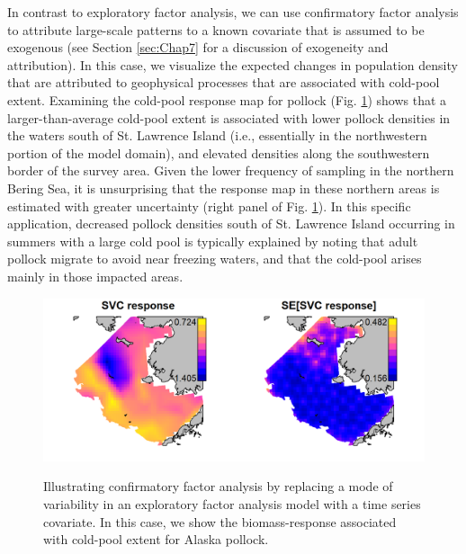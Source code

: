 In contrast to exploratory factor analysis, we can use confirmatory factor analysis to attribute large-scale patterns to a known covariate that is assumed to be exogenous (see Section \ref{sec:Chap7} for a discussion of exogeneity and attribution).  In this case, we visualize the expected changes in population density that are attributed to geophysical processes that are associated with cold-pool extent.  Examining the cold-pool response map for pollock (Fig. \ref{fig:Chap9_SVC_response}) shows that a larger-than-average cold-pool extent is associated with lower pollock densities in the waters south of St. Lawrence Island (i.e., essentially in the northwestern portion of the model domain), and elevated densities along the southwestern border of the survey area.  Given the lower frequency of sampling in the northern Bering Sea, it is unsurprising that the response map in these northern areas is estimated with greater uncertainty (right panel of Fig. \ref{fig:Chap9_SVC_response}).  In this specific application, decreased pollock densities south of St. Lawrence Island occurring in summers with a large cold pool is typically explained by noting that adult pollock migrate to avoid near freezing waters, and that the cold-pool arises mainly in those impacted areas.  

\begin{figure}[!ht]
    \caption[Pollock response to cold-pool extent]{Illustrating confirmatory factor analysis by replacing a mode of variability in an exploratory factor analysis model with a time series covariate.  In this case, we show the biomass-response associated with cold-pool extent for Alaska pollock.}
    \centering
    \includegraphics[width=5.5in]{Chap_9/SVC_response.png}
    \label{fig:Chap9_SVC_response}
\end{figure}

